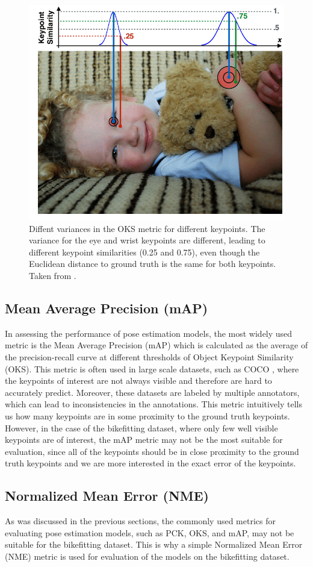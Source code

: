 \begin{figure}[htbp]
    \centering
    \includegraphics[width=0.7\linewidth]{obrazky-figures/oks.png}
    \caption{Diffent variances in the OKS metric for different keypoints. The variance for the eye and wrist keypoints are different, leading to different keypoint similarities (0.25 and 0.75), even though the Euclidean distance to ground truth is the same for both keypoints. Taken from \cite{oks}.}
    \label{fig:oks}
\end{figure}

\subsection{Mean Average Precision (mAP)}

In assessing the performance of pose estimation models, the most widely used metric is the Mean Average Precision (mAP) which is calculated as the average of the precision-recall curve at different thresholds of Object Keypoint Similarity (OKS). This metric is often used in large scale datasets, such as COCO \cite{coco}, where the keypoints of interest are not always visible and therefore are hard to accurately predict. Moreover, these datasets are labeled by multiple annotators, which can lead to inconsistencies in the annotations.
This metric intuitively tells us how many keypoints are in some proximity to the ground truth keypoints. However, in the case of the bikefitting dataset, where only few well visible keypoints are of interest, the mAP metric may not be the most suitable for evaluation, since all of the keypoints should be in close proximity to the ground truth keypoints and we are more interested in the exact error of the keypoints.


\subsection{Normalized Mean Error (NME)}
\label{nme}
As was discussed in the previous sections, the commonly used metrics for evaluating pose estimation models, such as PCK, OKS, and mAP, may not be suitable for the bikefitting dataset. This is why a simple Normalized Mean Error (NME) metric is used for evaluation of the models on the bikefitting dataset.


